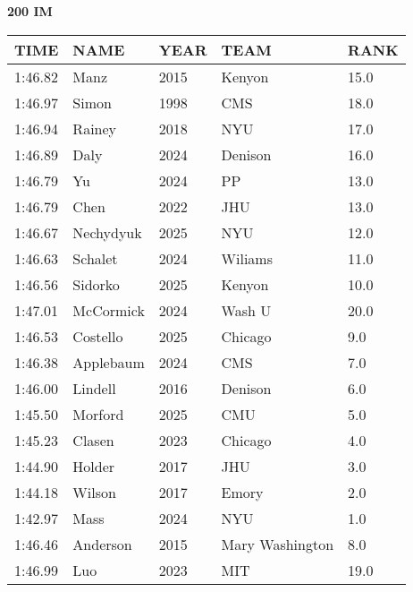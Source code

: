 \begin{minipage}[t]{0.48\textwidth}
\centering
\textbf{200 IM}\\[0.05cm]
\begin{tabular}{@{}p{1.8cm}p{2.8cm}p{1.2cm}p{1.4cm}p{0.8cm}@{}}
\hline
\textbf{TIME} & \textbf{NAME} & \textbf{YEAR} & \textbf{TEAM} & \textbf{RANK} \\
\hline
1:46.82 & Manz & 2015 & Kenyon & 15.0 \\
1:46.97 & Simon & 1998 & CMS & 18.0 \\
1:46.94 & Rainey & 2018 & NYU & 17.0 \\
1:46.89 & Daly & 2024 & Denison & 16.0 \\
1:46.79 & Yu & 2024 & PP & 13.0 \\
1:46.79 & Chen & 2022 & JHU & 13.0 \\
1:46.67 & Nechydyuk & 2025 & NYU & 12.0 \\
1:46.63 & Schalet & 2024 & Wiliams & 11.0 \\
1:46.56 & Sidorko & 2025 & Kenyon & 10.0 \\
1:47.01 & McCormick & 2024 & Wash U & 20.0 \\
1:46.53 & Costello & 2025 & Chicago & 9.0 \\
1:46.38 & Applebaum & 2024 & CMS & 7.0 \\
1:46.00 & Lindell & 2016 & Denison & 6.0 \\
1:45.50 & Morford & 2025 & CMU & 5.0 \\
1:45.23 & Clasen & 2023 & Chicago & 4.0 \\
1:44.90 & Holder & 2017 & JHU & 3.0 \\
1:44.18 & Wilson & 2017 & Emory & 2.0 \\
1:42.97 & Mass & 2024 & NYU & 1.0 \\
1:46.46 & Anderson & 2015 & Mary Washington & 8.0 \\
1:46.99 & Luo & 2023 & MIT & 19.0 \\
\hline
\end{tabular}
\end{minipage}\hfill

